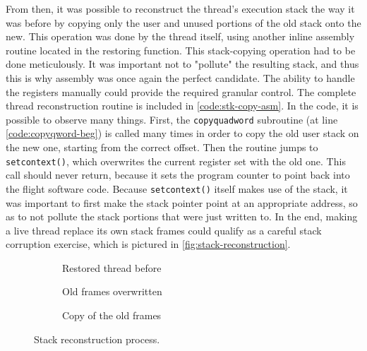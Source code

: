 From then, it was possible to reconstruct the thread's execution stack the way it was before by copying only the user and unused portions of the old stack onto the new. This operation was done by the thread itself, using another inline assembly routine located in the restoring function. This stack-copying operation had to be done meticulously. It was important not to "pollute" the resulting stack, and thus this is why assembly was once again the perfect candidate. The ability to handle the registers manually could provide the required granular control. The complete thread reconstruction routine is included in \autoref{code:stk-copy-asm}. In the code, it is possible to observe many things. First, the \texttt{copyquadword} subroutine (at line \ref{code:copyqword-beg}) is called many times in order to copy the old user stack on the new one, starting from the correct offset. Then the routine jumps to \texttt{setcontext()}, which overwrites the current register set with the old one. This call should never return, because it sets the program counter to point back into the flight software code. Because \texttt{setcontext()} itself makes use of the stack\cite{online:setcontext}, it was important to first make the stack pointer point at an appropriate address, so as to not pollute the stack portions that were just written to. In the end, making a live thread replace its own stack frames could qualify as a careful stack corruption exercise, which is pictured in \autoref{fig:stack-reconstruction}.

\begin{figure}[htbp]
	\centering
	\begin{subfigure}{.33\linewidth}
		\centering\small
		
		\caption{Restored thread before}
	\end{subfigure}%
	\begin{subfigure}{.33\linewidth}
		\centering\small
		
		\caption{Old frames overwritten}
	\end{subfigure}%
	\begin{subfigure}{.33\linewidth}
		\centering\small
		
		\caption{Copy of the old frames}
	\end{subfigure}
	\caption{Stack reconstruction process.}
	\label{fig:stack-reconstruction}
\end{figure}

